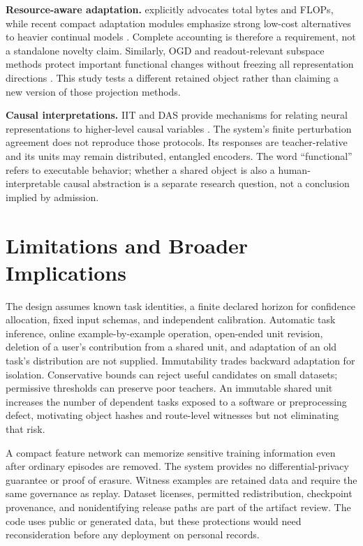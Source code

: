 \documentclass{article}
\begin{document}
\textbf{Resource-aware adaptation.} \citet{seo2024} explicitly advocates total bytes and FLOPs, while recent compact adaptation modules emphasize strong low-cost alternatives to heavier continual models \cite{yildirim2026}. Complete accounting is therefore a requirement, not a standalone novelty claim. Similarly, OGD and readout-relevant subspace methods protect important functional changes without freezing all representation directions \cite{farajtabar2020,anthes2025}. This study tests a different retained object rather than claiming a new version of those projection methods.

\textbf{Causal interpretations.} IIT and DAS provide mechanisms for relating neural representations to higher-level causal variables \cite{geiger2022,geiger2024}. The system's finite perturbation agreement does not reproduce those protocols. Its responses are teacher-relative and its units may remain distributed, entangled encoders. The word ``functional'' refers to executable behavior; whether a shared object is also a human-interpretable causal abstraction is a separate research question, not a conclusion implied by admission.

\section{Limitations and Broader Implications}
The design assumes known task identities, a finite declared horizon for confidence allocation, fixed input schemas, and independent calibration. Automatic task inference, online example-by-example operation, open-ended unit revision, deletion of a user's contribution from a shared unit, and adaptation of an old task's distribution are not supplied. Immutability trades backward adaptation for isolation. Conservative bounds can reject useful candidates on small datasets; permissive thresholds can preserve poor teachers. An immutable shared unit increases the number of dependent tasks exposed to a software or preprocessing defect, motivating object hashes and route-level witnesses but not eliminating that risk.

A compact feature network can memorize sensitive training information even after ordinary episodes are removed. The system provides no differential-privacy guarantee or proof of erasure. Witness examples are retained data and require the same governance as replay. Dataset licenses, permitted redistribution, checkpoint provenance, and nonidentifying release paths are part of the artifact review. The code uses public or generated data, but these protections would need reconsideration before any deployment on personal records.
\end{document}
